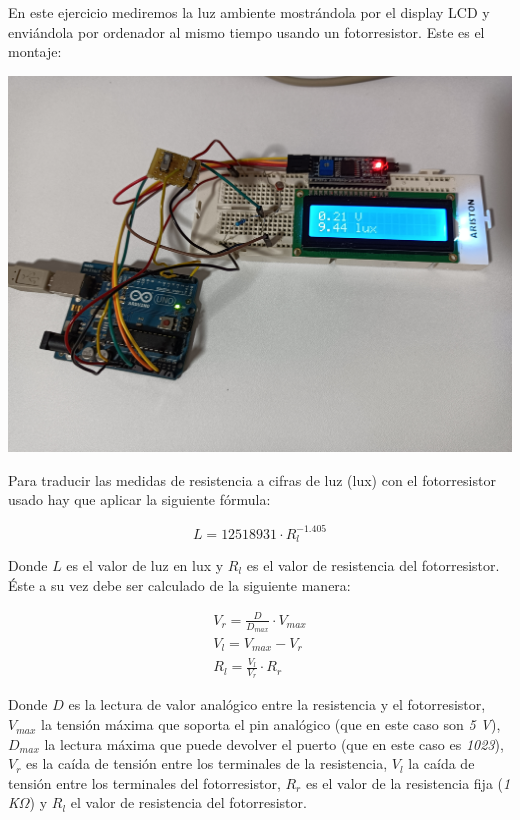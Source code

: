 En este ejercicio mediremos la luz ambiente mostrándola por el display LCD y
enviándola por ordenador al mismo tiempo usando un fotorresistor. Este es el
montaje:

\includegraphics[width=\linewidth]{luxmeter-reader-wiring.jpg}

Para traducir las medidas de resistencia a cifras de luz (lux) con el
fotorresistor usado hay que aplicar la siguiente fórmula:

\begin{equation*}
L = 12518931 \cdot R_l^{-1.405}
\end{equation*}

Donde $L$ es el valor de luz en lux y $R_l$ es el valor de resistencia del
fotorresistor. Éste a su vez debe ser calculado de la siguiente manera:

\begin{gather*}
V_r = \frac{D}{D_{max}} \cdot V_{max} \\
V_l = V_{max} - V_r \\
R_l = \frac{V_l}{V_r} \cdot R_r
\end{gather*}

Donde $D$ es la lectura de valor analógico entre la resistencia y el
fotorresistor, $V_{max}$ la tensión máxima que soporta el pin analógico (que en
este caso son \emph{5 V}), $D_{max}$ la lectura máxima que puede devolver el
puerto (que en este caso es \emph{1023}), $V_r$ es la caída de tensión entre
los terminales de la resistencia, $V_l$ la caída de tensión entre los
terminales del fotorresistor, $R_r$ es el valor de la resistencia fija
(\emph{1 K$\Omega$}) y $R_l$ el valor de resistencia del fotorresistor.

